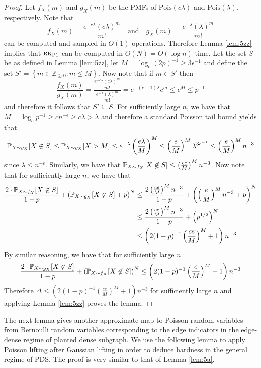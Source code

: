 \begin{proof}
Let $f_X(m)$ and $g_X(m)$ be the PMFs of $\text{Pois}(c \lambda)$ and $\text{Pois}(\lambda)$, respectively. Note that
$$f_X(m) = \frac{e^{-c \lambda} (c\lambda)^m}{m!} \quad \text{and} \quad g_X(m) = \frac{e^{-\lambda} (\lambda)^m}{m!}$$
can be computed and sampled in $O(1)$ operations. Therefore Lemma \ref{lem:5zz} implies that $\textsc{rk}_{\text{P1}}$ can be computed in $O(N) = O(\log n)$ time. Let the set $S$ be as defined in Lemma \ref{lem:5zz}, let $M =  \log_c (2p)^{-1} \ge 3\epsilon^{-1}$ and define the set $S' = \left\{ m \in \mathbb{Z}_{\ge 0} : m \le M \right\}$. Now note that if $m \in S'$ then
$$\frac{f_X(m)}{g_X(m)} = \frac{\frac{e^{-c \lambda} (c\lambda)^m}{m!}}{\frac{e^{-\lambda} (\lambda)^m}{m!}} = e^{-(c - 1)\lambda} c^m \le c^M \le p^{-1}$$
and therefore it follows that $S' \subseteq S$. For sufficiently large $n$, we have that $M = \log_c p^{-1} \ge cn^{-\epsilon} \ge c\lambda > \lambda$ and therefore a standard Poisson tail bound yields that
$$\mathbb{P}_{X \sim g_X}[X \not \in S] \le \mathbb{P}_{X \sim g_X}[X > M] \le e^{-\lambda} \left(\frac{e\lambda}{M} \right)^M \le \left(\frac{e}{M} \right)^M \lambda^{3\epsilon^{-1}} \le \left(\frac{e}{M} \right)^M n^{-3}$$
since $\lambda \le n^{-\epsilon}$. Similarly, we have that $\mathbb{P}_{X \sim f_X}[X \not \in S] \le \left(\frac{ce}{M} \right)^M n^{-3}$. Now note that for sufficiently large $n$, we have that
\begin{align*}
\frac{2 \cdot \mathbb{P}_{X \sim f_X} [X \not \in S]}{1 - p} + \left( \mathbb{P}_{X \sim g_X}[X \not \in S] + p \right)^{N} &\le \frac{2 \left(\frac{ce}{M} \right)^M n^{-3}}{1 - p} + \left( \left(\frac{e}{M} \right)^M n^{-3} + p \right)^N \\
&\le \frac{2 \left(\frac{ce}{M} \right)^M n^{-3}}{1 - p} + \left( p^{1/2} \right)^N \\
&\le \left( 2(1 - p)^{-1} \left(\frac{ce}{M} \right)^M + 1 \right) n^{-3}
\end{align*}
By similar reasoning, we have that for sufficiently large $n$
$$\frac{2 \cdot \mathbb{P}_{X \sim g_X} [X \not \in S]}{1 - p} + \left( \mathbb{P}_{X \sim f_X}[X \not \in S] \right)^{N} \le \left( 2(1 - p)^{-1} \left(\frac{e}{M} \right)^M + 1 \right) n^{-3}$$
Therefore $\Delta \le \left( 2(1 - p)^{-1} \left(\frac{ce}{M} \right)^M + 1 \right) n^{-3}$ for sufficiently large $n$ and applying Lemma \ref{lem:5zz} proves the lemma.
\end{proof}

The next lemma gives another approximate map to Poisson random variables from Bernoulli random variables corresponding to the edge indicators in the edge-dense regime of planted dense subgraph. We use the following lemma to apply Poisson lifting after Gaussian lifting in order to deduce hardness in the general regime of PDS. The proof is very similar to that of Lemma \ref{lem:5a}.

